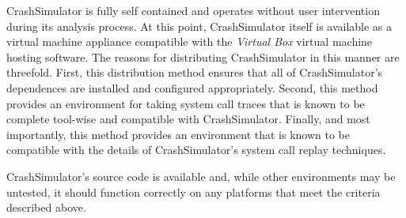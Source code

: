     CrashSimulator is fully self contained and operates without user
    intervention during its analysis process. At this point, CrashSimulator
    itself is available as a virtual machine appliance compatible with the
    \emph{Virtual Box} virtual machine hosting software.  The reasons for
    distributing CrashSimulator in this manner are threefold.  First, this
    distribution method ensures that all of CrashSimulator's dependences are
    installed and configured appropriately.  Second, this method provides an
    environment for taking system call traces that is known to be complete
    tool-wise and compatible with CrashSimulator.  Finally, and most importantly,
    this method provides an environment that is known to be compatible with the
    details of CrashSimulator's system call replay techniques.

    CrashSimulator's source code is available and, while other environments may
    be untested, it should function correctly on any platforms that meet the
    criteria described above.
